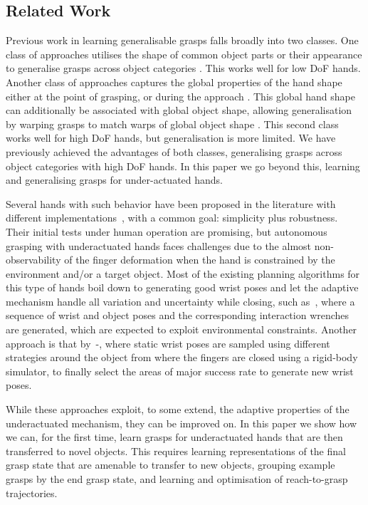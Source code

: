 
\subsection{Related Work}
Previous work in learning generalisable grasps falls broadly into two classes. One class of approaches utilises the shape of common object parts or their appearance to generalise grasps across object categories \cite{saxena2008b,detry2013a,herzog2014a, kroemer2012a}. This works well for low DoF hands. Another class of approaches captures the global properties of the hand shape either at the point of grasping, or during the approach \cite{ben2012generalization}. This global hand shape can additionally be associated with global object shape, allowing generalisation by warping grasps to match warps of global object shape \cite{hillenbrand2012transferring}. This second class works well for high DoF hands, but generalisation is more limited. We have previously achieved the advantages of both classes, generalising grasps across object categories with high DoF hands. In this paper we go beyond this, learning and generalising grasps for under-actuated hands.

Several hands with such behavior have been proposed in the literature with different implementations~\cite{Catalano2014Adaptive, Dollar2010Highly}, with a common goal: simplicity plus robustness. Their initial tests under human operation are promising, but autonomous grasping with underactuated hands faces challenges due to the almost non-observability of the finger deformation when the hand is constrained by the environment and/or a target object. Most of the existing planning algorithms for this type of hands boil down to generating good wrist poses and let the adaptive mechanism handle all variation and uncertainty while closing, such as~\cite{Eppner2015Planning}, where a sequence of wrist and object poses and the corresponding interaction wrenches are generated, which are expected to exploit environmental constraints. Another approach is that by~\cite{Bonilla2014Grasping}-\cite{Bonilla2015Grasp}, where static wrist poses are sampled using different strategies around the object from where the fingers are closed using a rigid-body simulator, to finally select the areas of major success rate to generate new wrist poses.

While these approaches exploit, to some extend, the adaptive properties of the underactuated mechanism, they can be improved on. In this paper we show how we can, for the first time, learn grasps for underactuated hands that are then transferred to novel objects. This requires learning representations of the final grasp state that are amenable to transfer to new objects, grouping example grasps by the end grasp state, and learning and optimisation of reach-to-grasp trajectories.
